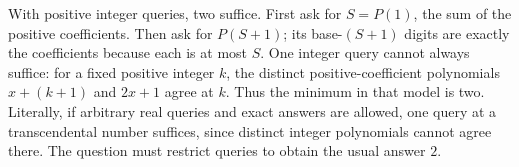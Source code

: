 With positive integer queries, two suffice. First ask for $S=P(1)$, the sum of the positive coefficients. Then ask for $P(S+1)$; its base-$(S+1)$ digits are exactly the coefficients because each is at most $S$. One integer query cannot always suffice: for a fixed positive integer $k$, the distinct positive-coefficient polynomials $x+(k+1)$ and $2x+1$ agree at $k$. Thus the minimum in that model is two. Literally, if arbitrary real queries and exact answers are allowed, one query at a transcendental number suffices, since distinct integer polynomials cannot agree there. The question must restrict queries to obtain the usual answer $\boxed2$.
